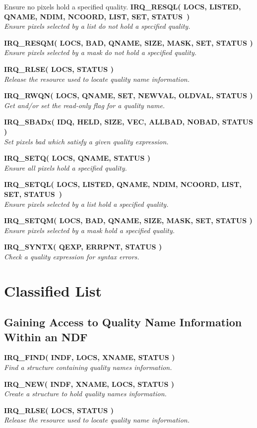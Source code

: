 \documentclass[twoside,11pt,nolof]{starlink}
\providecommand{\noteroutine}[2]{\textbf{#1}\hspace*{\fill}\nopagebreak \\
                             \hspace*{3em}\emph{#2}\hspace*{\fill}\par}
\begin{document}
   {Ensure no pixels hold a specified quality.}
\noteroutine{IRQ\_RESQL( LOCS, LISTED, QNAME, NDIM, NCOORD, LIST, SET, STATUS~)}
   {Ensure pixels selected by a list do not hold a specified quality.}
\noteroutine{IRQ\_RESQM( LOCS, BAD, QNAME, SIZE, MASK, SET, STATUS )}
   {Ensure pixels selected by a mask do not hold a specified quality.}
\noteroutine{IRQ\_RLSE( LOCS, STATUS )}
   {Release the resource used to locate quality name information.}
\noteroutine{IRQ\_RWQN( LOCS, QNAME, SET, NEWVAL, OLDVAL, STATUS )}
   {Get and/or set the read-only flag for a quality name.}
\noteroutine{IRQ\_SBADx( IDQ, HELD, SIZE, VEC, ALLBAD, NOBAD, STATUS )}
   {Set pixels bad which satisfy a given quality expression.}
\noteroutine{IRQ\_SETQ( LOCS, QNAME, STATUS )}
   {Ensure all pixels hold a specified quality.}
\noteroutine{IRQ\_SETQL( LOCS, LISTED, QNAME, NDIM, NCOORD, LIST, SET,
STATUS~)}
   {Ensure pixels selected by a list hold a specified quality.}
\noteroutine{IRQ\_SETQM( LOCS, BAD, QNAME, SIZE, MASK, SET, STATUS )}
   {Ensure pixels selected by a mask hold a specified quality.}
\noteroutine{IRQ\_SYNTX( QEXP, ERRPNT, STATUS )}
   {Check a quality expression for syntax errors.}

\newpage
\section {Classified List}

\subsection{Gaining Access to Quality Name Information Within an NDF}
\noteroutine{IRQ\_FIND( INDF, LOCS, XNAME, STATUS )}
   {Find a structure containing quality names information.}
\noteroutine{IRQ\_NEW( INDF, XNAME, LOCS, STATUS )}
   {Create a structure to hold quality names information.}
\noteroutine{IRQ\_RLSE( LOCS, STATUS )}
   {Release the resource used to locate quality name information.}
\end{document}
